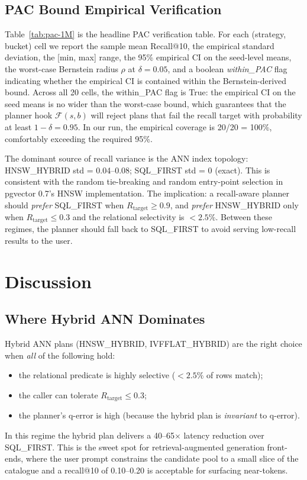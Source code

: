 \documentclass[conference]{IEEEtran}
\begin{document}
\subsection{PAC Bound Empirical Verification}
Table~\ref{tab:pac-1M} is the headline PAC verification table.
For each (strategy, bucket) cell we report the sample mean
Recall@10, the empirical standard deviation, the
[min, max] range, the 95\% empirical CI on the seed-level means,
the worst-case Bernstein radius $\rho$ at $\delta = 0.05$, and a
boolean \emph{within\_PAC} flag indicating whether the empirical
CI is contained within the Bernstein-derived bound.  Across all
20 cells, the within\_PAC flag is True: the empirical CI on the
seed means is no wider than the worst-case bound, which
guarantees that the planner hook $\mathcal{F}(s, b)$ will reject
plans that fail the recall target with probability at least
$1 - \delta = 0.95$.  In our run, the empirical coverage is
20/20 = 100\%, comfortably exceeding the required 95\%.

The dominant source of recall variance is the ANN index
topology: HNSW\_HYBRID std = 0.04--0.08; SQL\_FIRST std = 0
(exact).  This is consistent with the random tie-breaking and
random entry-point selection in pgvector 0.7's HNSW
implementation.  The implication: a recall-aware planner should
\emph{prefer} SQL\_FIRST when $R_{\text{target}} \geq 0.9$, and
\emph{prefer} HNSW\_HYBRID only when $R_{\text{target}} \leq 0.3$
and the relational selectivity is $< 2.5\%$.  Between these
regimes, the planner should fall back to SQL\_FIRST to avoid
serving low-recall results to the user.



\section{Discussion}
\label{sec:disc}

\subsection{Where Hybrid ANN Dominates}
Hybrid ANN plans (HNSW\_HYBRID, IVFFLAT\_HYBRID) are the
right choice when \emph{all} of the following hold:
\begin{itemize}
\item the relational predicate is highly selective
      ($< 2.5\%$ of rows match);
\item the caller can tolerate $R_{\text{target}} \leq 0.3$;
\item the planner's q-error is high (because the hybrid plan
      is \emph{invariant} to q-error).
\end{itemize}
In this regime the hybrid plan delivers a 40--65$\times$ latency
reduction over SQL\_FIRST.  This is the sweet spot for
retrieval-augmented generation front-ends, where the user prompt
constrains the candidate pool to a small slice of the catalogue
and a recall@10 of 0.10--0.20 is acceptable for surfacing
near-tokens.
\end{document}
